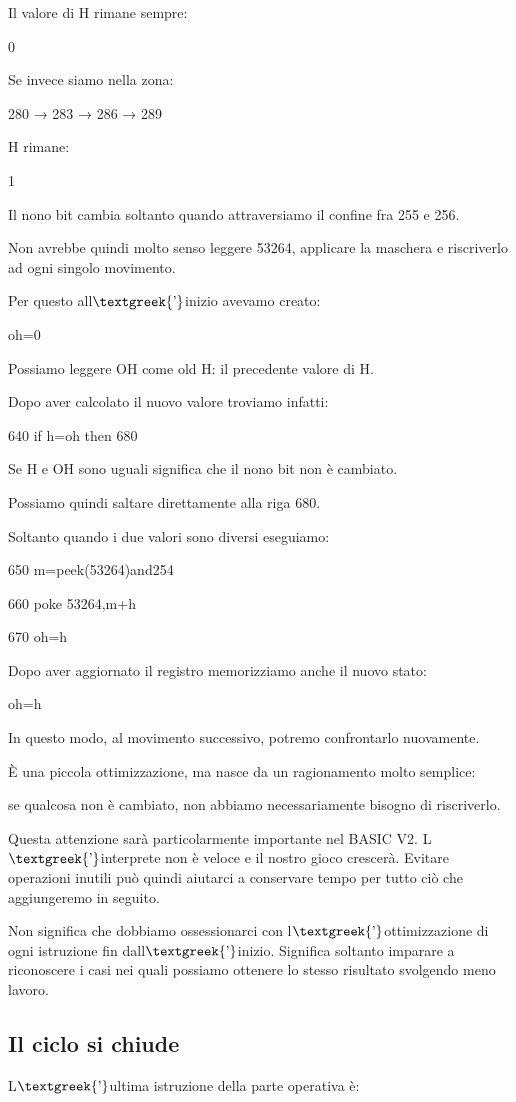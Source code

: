 \documentclass{article}
\begin{document}
Il valore di H rimane sempre:

0

Se invece siamo nella zona:

280 → 283 → 286 → 289

H rimane:

1

Il nono bit cambia soltanto quando attraversiamo il confine fra 255 e 256.

Non avrebbe quindi molto senso leggere 53264, applicare la maschera e riscriverlo ad ogni singolo movimento.

Per questo all$\text{\textgreek{’}}$inizio avevamo creato:

oh=0

Possiamo leggere OH come old H: il precedente valore di H.

Dopo aver calcolato il nuovo valore troviamo infatti:

640 if h=oh then 680

Se H e OH sono uguali significa che il nono bit non è cambiato.

Possiamo quindi saltare direttamente alla riga 680.

Soltanto quando i due valori sono diversi eseguiamo:

650 m=peek(53264)and254

660 poke 53264,m+h

670 oh=h

Dopo aver aggiornato il registro memorizziamo anche il nuovo stato:

oh=h

In questo modo, al movimento successivo, potremo confrontarlo nuovamente.

È una piccola ottimizzazione, ma nasce da un ragionamento molto semplice:

se qualcosa non è cambiato, non abbiamo necessariamente bisogno di riscriverlo.

Questa attenzione sarà particolarmente importante nel BASIC V2. L$\text{\textgreek{’}}$interprete non è veloce e il
nostro gioco crescerà. Evitare operazioni inutili può quindi aiutarci a conservare tempo per tutto ciò che aggiungeremo
in seguito.

Non significa che dobbiamo ossessionarci con l$\text{\textgreek{’}}$ottimizzazione di ogni istruzione fin
dall$\text{\textgreek{’}}$inizio. Significa soltanto imparare a riconoscere i casi nei quali possiamo ottenere lo
stesso risultato svolgendo meno lavoro.

\subsection{Il ciclo si chiude}
L$\text{\textgreek{’}}$ultima istruzione della parte operativa è:
\end{document}
